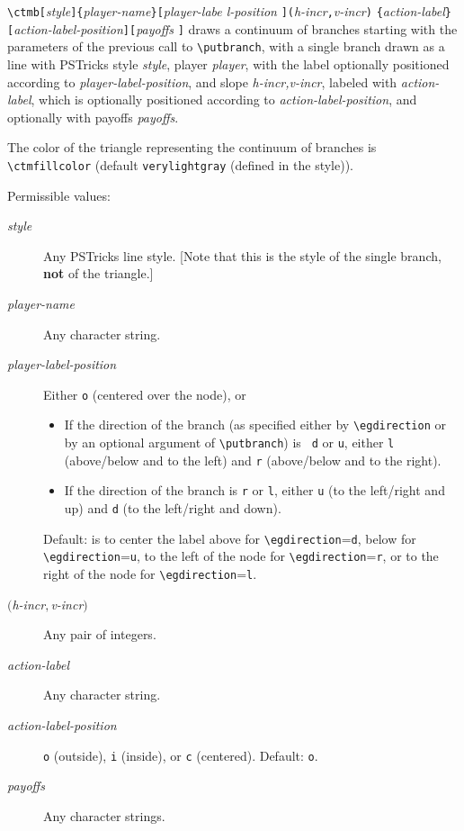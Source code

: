 \documentclass[12pt]{article}
\begin{document}
\vspace{4mm}

\noindent
\verb+\ctmb[+\emph{style}\verb+]{+\emph{player-name}\verb+}[+\emph{player-labe%
l-position}%
\verb+](+\emph{h-incr}\verb+,+\emph{v-incr}\verb+)+\newline
\verb+{+\emph{action-label}\verb+}[+\emph{action-label-position}\verb+][+\emph%
{payoffs}%
\verb+]+\newline
\noindent draws a continuum of branches starting with the parameters of the
previous call to \verb+\putbranch+, with a single branch drawn as a line with
PSTricks style \emph{style}, player \emph{player}, with the label optionally
positioned according to \emph{player-label-position}, and slope
\emph{h-incr,v-incr}, labeled with \emph{action-label}, which is optionally
positioned according to \emph{action-label-position}, and optionally with
payoffs \emph{payoffs}.

\sloppy
The color of the triangle representing the continuum of branches is
\verb+\ctmfillcolor+ (default \verb+verylightgray+ (defined in the style)).


\fussy
Permissible values:
\begin{description}
\item[\emph{style}] Any PSTricks line style.  [Note that this is the style of
the single branch, {\bfseries not} of the triangle.]
\item[\emph{player-name}] Any character string.
\item[\emph{player-label-position}] Either \verb+o+ (centered over the node),
or
\begin{itemize}
   \item If the direction of the branch (as specified either by
\verb+\egdirection+ or by an optional argument of \verb+\putbranch+) is {\tt
d} or {\tt u}, either {\tt l} (above/below and to the left) and {\tt r}
(above/below and to the right).
   \item If the direction of the branch is {\tt r} or {\tt l}, either {\tt u}
(to the left/right and up) and {\tt d} (to the left/right and down). 
\end{itemize}
Default: is to center the label above for \verb+\egdirection+=\verb+d+, below
for \verb+\egdirection+=\verb+u+, to the left of the node for
\verb+\egdirection+=\verb+r+, or to the right of the node for
\verb+\egdirection+=\verb+l+.
\item[$($\emph{h-incr}$,$\emph{v-incr}$)$] Any pair of integers.
\item[\emph{action-label}] Any character string.
\item[\emph{action-label-position}] \verb+o+ (outside), \verb+i+ (inside), or
\verb+c+ (centered).  Default: \verb+o+.
\item[\emph{payoffs}] Any character strings.
\end{description}
\end{document}
